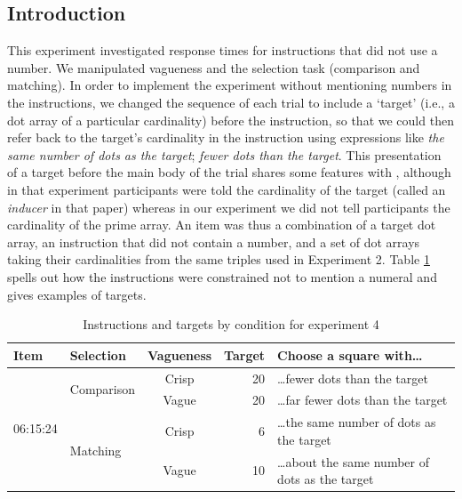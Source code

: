 \documentclass[%
man,		%
floatsintext,%
apacite%
]{apa6}
\begin{document}
\subsection{Introduction}
This experiment investigated response times for instructions that did not use a number. 
We manipulated vagueness and the selection task (comparison and matching). 
In order to implement the experiment without mentioning numbers in the instructions, we changed the sequence of each trial to include a `target' (i.e., a dot array of a particular cardinality) before the instruction, so that we could then refer back to the target's cardinality in the instruction using expressions like \emph{the same number of dots as the target}; \emph{fewer dots than the target}.
%
This presentation of a target before the main body of the trial shares some features with , although in that experiment participants were told the cardinality of the target (called an \emph{inducer} in that paper) whereas in our experiment we did not tell participants the cardinality of the prime array.
An item was thus a combination of a target dot array, an instruction that did not contain a number, and a set of dot arrays taking their cardinalities from the same triples used in Experiment 2.
Table \ref{Instructions for e4} spells out how the instructions were constrained not to mention a numeral and gives examples of targets.

\begin{table}[htp]
\caption{Instructions and targets by condition for experiment 4}
\begin{center}
\begin{tabular}{llcrl}
Item					&Selection				&Vagueness	&Target	&Choose a square with\ldots						\\
\toprule
\multirow{4}{*}{06:15:24} 	&\multirow{2}{*}{Comparison} 	&Crisp		&20		&\ldots fewer dots than the target					\\
\cline{3-5}
					&						&Vague		&20		&\ldots far fewer dots than the target					\\
					\cline{2-5}
					&\multirow{2}{*}{Matching}		& Crisp		&6		&\ldots the same number of dots as the target			\\
					\cline{3-5}
					& 		 				&Vague		&10 		&\ldots about the same number of dots as the target		\\
					\bottomrule
\end{tabular}
\end{center}
\label{Instructions for e4}
\end{table}%
	
\end{document}
